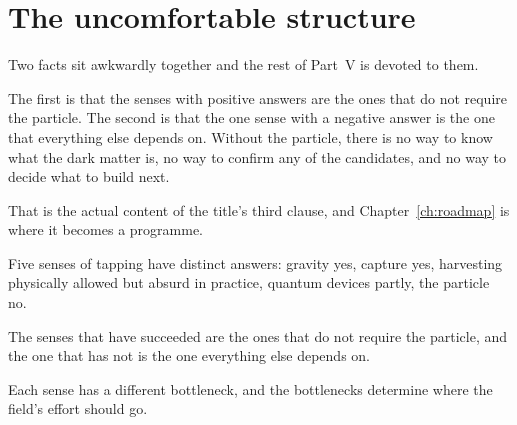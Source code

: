 \section{The uncomfortable structure}Two facts sit awkwardly together and the rest
of Part~V is devoted to them.

The first is that the senses with positive answers are the ones that do not
require the particle. The second is that the one sense with a negative
answer is the one that everything else depends on. Without the particle,
there is no way to know what the dark matter is, no way to confirm any of
the candidates, and no way to decide what to build next.

That is the actual content of the title's third clause, and Chapter~\ref{ch:roadmap}
is where it becomes a programme.

\begin{keytakeaways}
\item Five senses of tapping have distinct answers: gravity yes, capture
yes, harvesting physically allowed but absurd in practice, quantum devices
partly, the particle no.
\item The senses that have succeeded are the ones that do not require the
particle, and the one that has not is the one everything else depends on.
\item Each sense has a different bottleneck, and the bottlenecks determine
where the field's effort should go.
\end{keytakeaways}
